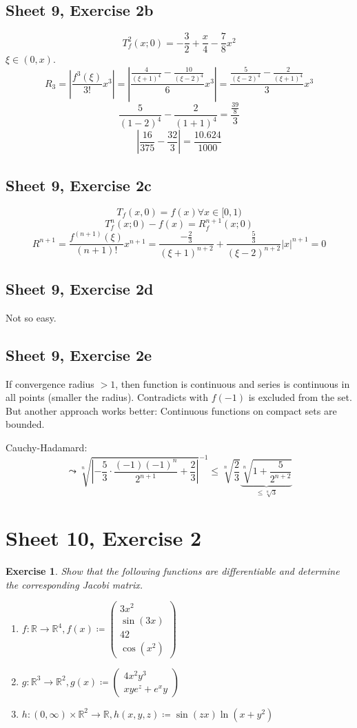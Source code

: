 \documentclass{article}
\newtheorem{ex}{Exercise} %
\newcommand{\card}[1]{\left|#1\right|}
\begin{document}
\subsection{Sheet 9, Exercise 2b}
\[ T_f^2(x; 0) = -\frac32 + \frac x4 - \frac78 x^2 \]
$\xi \in (0, x)$.
\[ R_3 = \card{\frac{f^3(\xi)}{3!} x^3} = \card{\frac{\frac{4}{(\xi + 1)^4} - \frac{10}{(\xi - 2)^4}}{6} x^3} = \frac{\frac{5}{(\xi - 2)^4} - \frac{2}{(\xi + 1)^4}}{3} x^3 \]
\[ \frac{5}{(1 - 2)^4} - \frac{2}{(1 + 1)^4} = \frac{\frac{39}8}{3} \]
\[ \card{\frac{16}{375} - \frac{32}{3}} = \frac{10.624}{1000} \]

\subsection{Sheet 9, Exercise 2c}
\[ T_f(x, 0) = f(x) \forall x \in [0, 1) \]
\[ T_f^n(x; 0) - f(x) = R^{n+1}_f(x; 0) \]
\[ R^{n+1} = \frac{f^{(n+1)}(\xi)}{(n+1)!} x^{n+1} = \frac{-\frac23}{(\xi + 1)^{n+2}} + \frac{\frac53}{(\xi - 2)^{n+2}} \card{x}^{n+1} = 0 \]

\subsection{Sheet 9, Exercise 2d}
Not so easy.

\subsection{Sheet 9, Exercise 2e}
If convergence radius $>1$, then function is continuous and series is continuous in all points (smaller the radius). Contradicts with $f(-1)$ is excluded from the set. But another approach works better: Continuous functions on compact sets are bounded.

Cauchy-Hadamard:
\[ \leadsto \sqrt[n]{\card{-\frac53 \cdot \frac{(-1)(-1)^n}{2^{n+1}} + \frac23}}^{-1} \leq \sqrt[n]{\frac23} \underbrace{\sqrt[n]{1 + \frac{5}{2^{n+2}}}}_{\leq \sqrt[n]{3}} \]

\section{Sheet 10, Exercise 2}
\begin{ex}
  Show that the following functions are differentiable and determine the corresponding Jacobi matrix.
  \begin{enumerate}
    \item $f: \mathbb R \to \mathbb R^4, f(x) \coloneqq \begin{pmatrix} 3x^2 \\ \sin(3x) \\ 42 \\ \cos(x^2) \end{pmatrix}$
    \item $g: \mathbb R^3 \to \mathbb R^2, g(x) \coloneqq \begin{pmatrix} 4x^2 y^3 \\ xye^z + e^x y \end{pmatrix}$
    \item $h: (0, \infty) \times \mathbb R^2 \to \mathbb R, h(x, y, z) \coloneqq \sin(zx) \ln(x + y^2)$
  \end{enumerate}
\end{ex}
\end{document}
